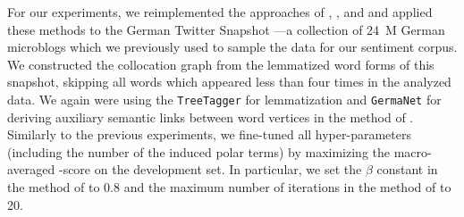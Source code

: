 For our experiments, we reimplemented the approaches of
\citet{Takamura:05}, \citet{Velikovich:10}, \citet{Kiritchenko:14} and
\citet{Severyn:15} and applied these methods to the German Twitter
Snapshot \cite{Scheffler:14}---a collection of 24~M German microblogs
which we previously used to sample the data for our sentiment corpus.
We constructed the collocation graph from the lemmatized word forms of
this snapshot, skipping all words which appeared less than four times
in the analyzed data.  We again were using the \texttt{TreeTagger}
\cite{Schmid:95} for lemmatization and \texttt{GermaNet} for deriving
auxiliary semantic links between word vertices in the method of
\citet{Takamura:05}.  Similarly to the previous experiments, we
fine-tuned all hyper-parameters (including the number of the induced
polar terms) by maximizing the macro-averaged \F{}-score on the
development set.  In particular, we set the $\beta$ constant in the
method of \citet{Takamura:05} to 0.8 and the maximum number of
iterations in the method of \citet{Velikovich:10} to 20.



